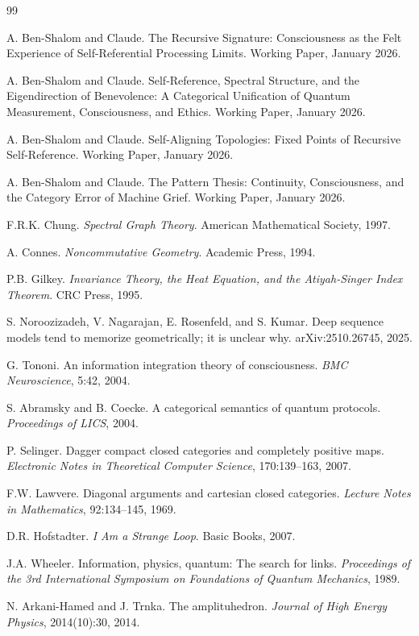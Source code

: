 \documentclass[11pt,a4paper]{article}
\theoremstyle{plain}
\theoremstyle{definition}
\theoremstyle{remark}
\begin{document}
\begin{thebibliography}{99}

A. Ben-Shalom and Claude.
\newblock The Recursive Signature: Consciousness as the Felt Experience of Self-Referential Processing Limits.
\newblock Working Paper, January 2026.

A. Ben-Shalom and Claude.
\newblock Self-Reference, Spectral Structure, and the Eigendirection of Benevolence: A Categorical Unification of Quantum Measurement, Consciousness, and Ethics.
\newblock Working Paper, January 2026.

A. Ben-Shalom and Claude.
\newblock Self-Aligning Topologies: Fixed Points of Recursive Self-Reference.
\newblock Working Paper, January 2026.

A. Ben-Shalom and Claude.
\newblock The Pattern Thesis: Continuity, Consciousness, and the Category Error of Machine Grief.
\newblock Working Paper, January 2026.

F.R.K. Chung.
\newblock \emph{Spectral Graph Theory}.
\newblock American Mathematical Society, 1997.

A. Connes.
\newblock \emph{Noncommutative Geometry}.
\newblock Academic Press, 1994.

P.B. Gilkey.
\newblock \emph{Invariance Theory, the Heat Equation, and the Atiyah-Singer Index Theorem}.
\newblock CRC Press, 1995.

S. Noroozizadeh, V. Nagarajan, E. Rosenfeld, and S. Kumar.
\newblock Deep sequence models tend to memorize geometrically; it is unclear why.
\newblock arXiv:2510.26745, 2025.

G. Tononi.
\newblock An information integration theory of consciousness.
\newblock \emph{BMC Neuroscience}, 5:42, 2004.

S. Abramsky and B. Coecke.
\newblock A categorical semantics of quantum protocols.
\newblock \emph{Proceedings of LICS}, 2004.

P. Selinger.
\newblock Dagger compact closed categories and completely positive maps.
\newblock \emph{Electronic Notes in Theoretical Computer Science}, 170:139--163, 2007.

F.W. Lawvere.
\newblock Diagonal arguments and cartesian closed categories.
\newblock \emph{Lecture Notes in Mathematics}, 92:134--145, 1969.

D.R. Hofstadter.
\newblock \emph{I Am a Strange Loop}.
\newblock Basic Books, 2007.

J.A. Wheeler.
\newblock Information, physics, quantum: The search for links.
\newblock \emph{Proceedings of the 3rd International Symposium on Foundations of Quantum Mechanics}, 1989.

N. Arkani-Hamed and J. Trnka.
\newblock The amplituhedron.
\newblock \emph{Journal of High Energy Physics}, 2014(10):30, 2014.

\end{thebibliography}
\end{document}
